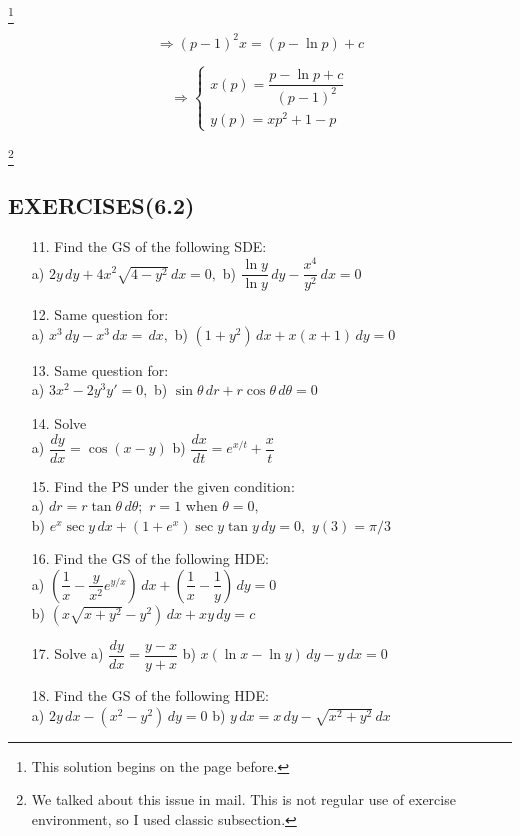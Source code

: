 \documentclass{amsbook}
\begin{document}

\footnote{This solution begins on the page before.}
\begin{hSolution}
	\[
		\Rightarrow (p - 1)^2 x = (p - \ln p) + c
	\]
	
	\[	
		\Rightarrow
		\begin{cases}
			x(p) = \dfrac{p - \ln p + c}{(p - 1)^2} \\
			y(p) = xp^2 + 1 - p
		\end{cases}
	\]
\end{hSolution}

\footnote{We talked about this issue in mail. This is not regular use of exercise environment, so I used classic subsection.}
\subsection{EXERCISES(6.2)}
\begin{enumerate}
\item [11.] Find the GS of the following SDE: \\
a) $2y\,dy + 4x^2\sqrt{4 - y^2}\,dx = 0,$ \quad b) $\dfrac{\ln y}{\ln y}\,dy - \dfrac{x^4}{y^2}\,dx = 0$
\item [12.] Same question for: \\
a) $x^3\,dy - x^3\,dx = \,dx ,$ \quad b) $(1 + y^2)\,dx + x(x + 1)\,dy = 0$
\item [13.] Same question for: \\
a) $3x^2 - 2y^3 y' = 0,$ \quad b) $\sin\theta\,dr + r\cos\theta\,d\theta = 0$
\item [14.] Solve \\
a) $\dfrac{dy}{dx} = \cos(x - y)$ \quad b) $\dfrac{dx}{dt} = e^{x / t} + \dfrac{x}{t}$
\item [15.] Find the PS under the given condition: \\
a) $dr = r\tan\theta\,d\theta;$ $r = 1$ when $\theta = 0,$ \\
b) $e^x\sec y \,dx + (1 + e ^ x)\sec y \tan y\,dy = 0,$ $y(3) = \pi / 3$
\item [16.] Find the GS of the following HDE: \\
a) $(\dfrac{1}{x} - \dfrac{y}{x^2}e^{y / x})\,dx + (\dfrac{1}{x} - \dfrac{1}{y})\,dy = 0$ \\
b) $(x\sqrt{x + y^2} - y^2)\,dx + xy\,dy = c$
\item [17.] Solve
a) $\dfrac{dy}{dx} = \dfrac{y - x}{y + x}$ \quad b) $x(\ln x - \ln y)\,dy - y\,dx = 0$
\item[18.] Find the GS of the following HDE: \\
a) $2y\,dx - (x^2 - y^2)\,dy = 0$ \quad b) $y\,dx = x\,dy - \sqrt{x^2 + y^2}\,dx$
\end{enumerate}
\end{document}
